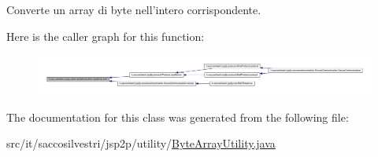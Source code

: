\-Converte un array di byte nell'intero corrispondente. 



\-Here is the caller graph for this function\-:
\nopagebreak
\begin{figure}[H]
\begin{center}
\leavevmode
\includegraphics[width=350pt]{classit_1_1saccosilvestri_1_1jsp2p_1_1utility_1_1_byte_array_utility_a595f511cfd7faf60b35a75c1900a9e2d_icgraph}
\end{center}
\end{figure}




\-The documentation for this class was generated from the following file\-:\begin{DoxyCompactItemize}
\item 
src/it/saccosilvestri/jsp2p/utility/\hyperlink{_byte_array_utility_8java}{\-Byte\-Array\-Utility.\-java}\end{DoxyCompactItemize}
